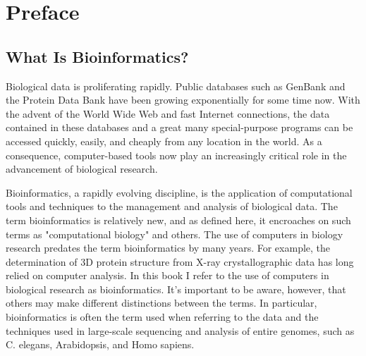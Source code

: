 \chapter*{Preface}
\minitoc %

\section*{What Is Bioinformatics?}
Biological data is proliferating rapidly. Public databases such as GenBank and the Protein Data Bank have been growing exponentially for some time now. With the advent of the World Wide Web and fast Internet connections, the data contained in these databases and a great many special-purpose programs can be accessed quickly, easily, and cheaply from any location in the world. As a consequence, computer-based tools now play an increasingly critical role in the advancement of biological research.

Bioinformatics, a rapidly evolving discipline, is the application of computational tools and techniques to the management and analysis of biological data. The term bioinformatics is relatively new, and as defined here, it encroaches on such terms as "computational biology" and others. The use of computers in biology research predates the term bioinformatics by many years. For example, the determination of 3D protein structure from X-ray crystallographic data has long relied on computer analysis. In this book I refer to the use of computers in biological research as bioinformatics. It's important to be aware, however, that others may make different distinctions between the terms.  In particular, bioinformatics is often the term used when referring to the data and the techniques used in large-scale sequencing and analysis of entire genomes, such as C. elegans, Arabidopsis, and Homo sapiens. 

